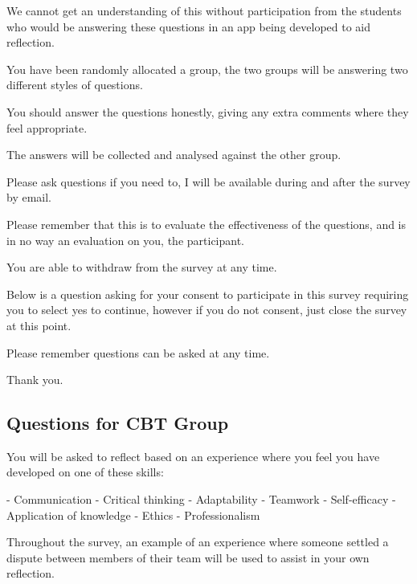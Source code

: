 \documentclass{l4proj}
\begin{document}
\begin{appendices}
We cannot get an understanding of this without participation from the students who would be answering these questions in an app being developed to aid reflection. 

You have been randomly allocated a group, the two groups will be answering two different styles of questions. 

You should answer the questions honestly, giving any extra comments where they feel appropriate.

The answers will be collected and analysed against the other group. 

Please ask questions if you need to, I will be available during and after the survey by email.

Please remember that this is to evaluate the effectiveness of the questions, and is in no way an evaluation on you, the participant.

You are able to withdraw from the survey at any time.

Below is a question asking for your consent to participate in this survey requiring you to select yes to continue, however if you do not consent, just close the survey at this point.

Please remember questions can be asked at any time.


Thank you.

\subsection{Questions for CBT Group}

You will be asked to reflect based on an experience where you feel you have developed on one of these skills:

- Communication
- Critical thinking
- Adaptability
- Teamwork
- Self-efficacy
- Application of knowledge
- Ethics
- Professionalism 

Throughout the survey, an example of an experience where someone settled a dispute between members of their team will be used to assist in your own reflection.


\end{appendices}
\end{document}
